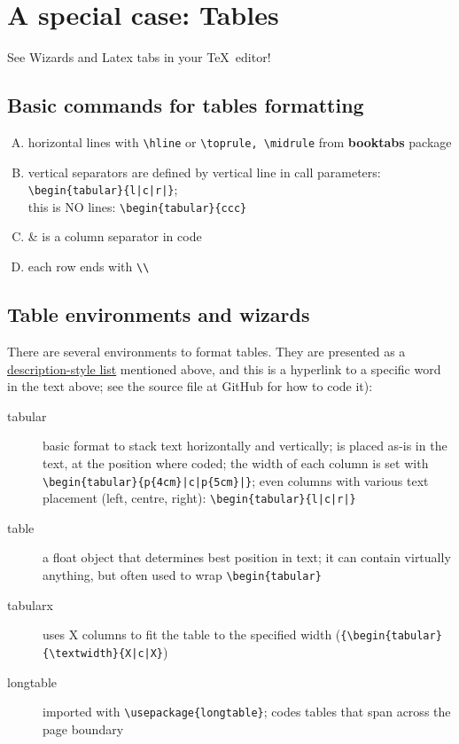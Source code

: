 \documentclass[a4paper,11pt]{article}
\begin{document}
\section{A special case: Tables}\label{sec:tabs}

See Wizards and Latex tabs in your \TeX~editor!

\subsection{Basic commands for tables formatting}
\begin{enumerate}[A)]
	\item horizontal lines with \verb|\hline| or \verb|\toprule, \midrule| from \textbf{booktabs} package
	\item vertical separators are defined by vertical line in call parameters: \verb-\begin{tabular}{l|c|r|}-;\\ this is NO lines: \verb-\begin{tabular}{ccc}-
	\item \& is a column separator in code
	\item each row ends with \verb|\\|
\end{enumerate}

\subsection{Table environments and wizards}

There are several environments to format tables. They are presented as a \hyperlink{wd:desc}{description-style list} mentioned above, and this is a hyperlink to a specific word in the text above; see the source file at GitHub for how to code it):
\setlength\fboxsep{3pt} %
\setlength\fboxrule{1pt} %
\begin{description}
	\item[tabular] basic format to stack text horizontally and vertically; is placed as-is in the text, at the position where coded; the width of each column is set with \verb-\begin{tabular}{p{4cm}|c|p{5cm}|}-; even columns with various text placement (left, centre, right): \verb-\begin{tabular}{l|c|r|}-
	\item[table] a float object that determines best position in text; it can contain virtually anything, but often used to wrap \verb|\begin{tabular}|
	\item[tabularx] uses X columns to fit the table to the specified width (\verb-{\begin{tabular}{\textwidth}{X|c|X}-)
	\item[longtable] imported with \verb|\usepackage{longtable}|; codes tables that span across the page boundary

\end{description}
\end{document}
